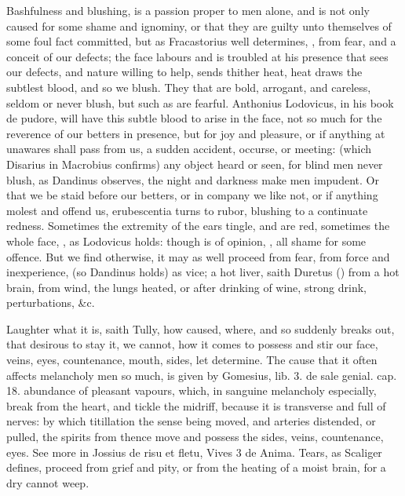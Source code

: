 {Bashfulness and blushing, is a passion proper to men alone, and
is not only caused for some shame and ignominy, or that they are
guilty unto themselves of some foul fact committed, but as
Fracastorius well determines, ,
from fear, and a conceit of our defects; the face labours and is
troubled at his presence that sees our defects, and nature willing to
help, sends thither heat, heat draws the subtlest blood, and so we
blush. They that are bold, arrogant, and careless, seldom or never
blush, but such as are fearful. Anthonius Lodovicus, in his book de
pudore, will have this subtle blood to arise in the face, not so much
for the reverence of our betters in presence, but for joy and
pleasure, or if anything at unawares shall pass from us, a sudden
accident, occurse, or meeting: (which Disarius in  Macrobius
confirms) any object heard or seen, for blind men never blush, as
Dandinus observes, the night and darkness make men impudent. Or that we
be staid before our betters, or in company we like not, or if anything
molest and offend us, erubescentia turns to rubor, blushing to a
continuate redness. Sometimes the extremity of the ears tingle,
and are red, sometimes the whole face, ,
as Lodovicus holds: though \Aristotle{} is of opinion, , all shame for some offence. But we find otherwise, it
may as well proceed from fear, from force and inexperience, (so
Dandinus holds) as vice; a hot liver, saith Duretus () from a hot brain, from wind, the lungs heated, or after
drinking of wine, strong drink, perturbations, \&c.

Laughter what it is, saith Tully, how caused, where, and so
suddenly breaks out, that desirous to stay it, we cannot, how it comes
to possess and stir our face, veins, eyes, countenance, mouth, sides,
let \Democritus{} determine. The cause that it often affects melancholy
men so much, is given by Gomesius, lib. 3. de sale genial. cap. 18.
abundance of pleasant vapours, which, in sanguine melancholy
especially, break from the heart, and tickle the midriff, because
it is transverse and full of nerves: by which titillation the sense
being moved, and arteries distended, or pulled, the spirits from thence
move and possess the sides, veins, countenance, eyes. See more in
\textlatin{Jossius de risu et fletu, Vives 3 de Anima}. Tears, as Scaliger defines,
proceed from grief and pity, or from the heating of a moist
brain, for a dry cannot weep.

}
